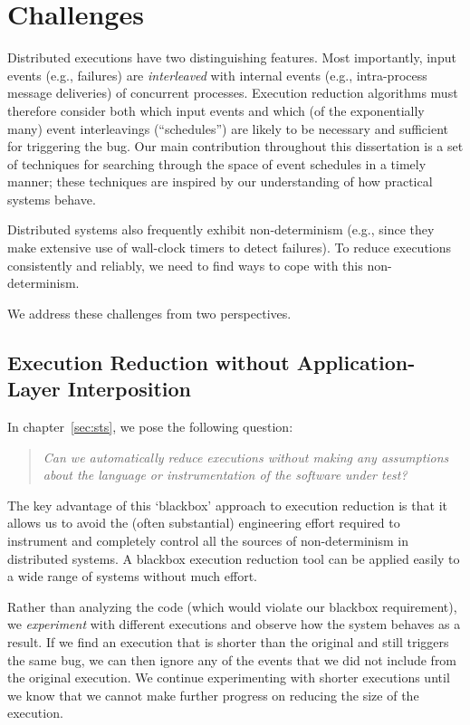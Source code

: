 
\section{Challenges}

Distributed executions have two distinguishing features. Most importantly, input events
(e.g., failures)
are {\em interleaved} with internal events (e.g., intra-process
message deliveries) of concurrent processes. Execution reduction algorithms must therefore consider both which
input events and which (of the exponentially many)
event interleavings (``schedules'') are likely to be necessary and sufficient for triggering the bug. Our main contribution
throughout this dissertation is a set of techniques for searching
through the space of event schedules in a timely manner; these techniques are inspired
by our understanding of how practical systems behave.

Distributed systems also frequently exhibit non-determinism (e.g., since they
make extensive use of wall-clock timers to detect failures). To reduce executions
consistently and reliably, we need to find ways to cope with this non-determinism.

We address these challenges from two perspectives.

\subsection{Execution Reduction without Application-Layer Interposition}

In chapter~\ref{sec:sts}, we pose
the following question:

\begin{quote}
\textit{Can we automatically reduce
executions without making any assumptions about the language or
instrumentation of the software under test?}
\end{quote}

The key advantage of this `blackbox' approach to execution reduction is that
it allows us to avoid the (often substantial) engineering effort required to
instrument and completely control all the sources of non-determinism in
distributed
systems. A blackbox execution reduction tool can be applied easily to a wide
range of systems without much effort.

Rather than analyzing the code (which would violate our blackbox requirement),
we \textit{experiment} with different executions and observe how the system
behaves as a result. If we find an execution that is shorter than the
original and still triggers the same bug, we can then ignore any of the
events that we did not include from the original execution. We continue
experimenting with shorter executions until we know that we cannot make
further progress on reducing the size of the execution.

